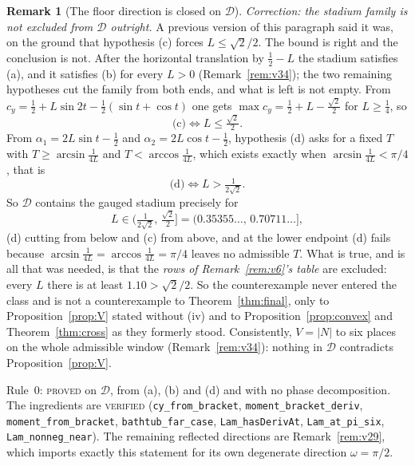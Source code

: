 \documentclass[11pt]{article}
\theoremstyle{definition}
\newtheorem{remark}[theorem]{Remark}
\begin{document}
\begin{remark}[The floor direction is closed on $\mathcal D$]
\emph{Correction: the stadium family is not excluded from $\mathcal D$ outright.} A previous
version of this paragraph said it was, on the ground that hypothesis (c) forces
$L\le\sqrt2/2$. The bound is right and the conclusion is not. After the horizontal
translation by $\tfrac12-L$ the stadium satisfies (a), and it satisfies (b) for every $L>0$
(Remark~\ref{rem:v34}); the two remaining hypotheses cut the family from both ends, and what
is left is not empty. From $c_y=\tfrac12+L\sin2t-\tfrac12(\sin t+\cos t)$ one gets
$\max c_y=\tfrac12+L-\tfrac{\sqrt2}2$ for $L\ge\tfrac14$, so
\[
  \text{(c)}\iff L\le\tfrac{\sqrt2}2 .
\]
From $\alpha_1=2L\sin t-\tfrac12$ and $\alpha_2=2L\cos t-\tfrac12$, hypothesis (d) asks for a
fixed $T$ with $T\ge\arcsin\tfrac1{4L}$ and $T<\arccos\tfrac1{4L}$, which exists exactly when
$\arcsin\tfrac1{4L}<\pi/4$, that is
\[
  \text{(d)}\iff L>\tfrac1{2\sqrt2} .
\]
So $\mathcal D$ contains the gauged stadium precisely for
\[
  L\in\bigl(\tfrac1{2\sqrt2},\,\tfrac{\sqrt2}2\bigr]=(0.35355\ldots,\,0.70711\ldots],
\]
(d) cutting from below and (c) from above, and at the lower endpoint (d) fails because
$\arcsin\tfrac1{4L}=\arccos\tfrac1{4L}=\pi/4$ leaves no admissible $T$. What is true, and is
all that was needed, is that the \emph{rows of Remark~\ref{rem:v6}'s table} are excluded:
every $L$ there is at least $1.10>\sqrt2/2$. So the counterexample never entered the class
and is not a counterexample to Theorem~\ref{thm:final}, only to Proposition~\ref{prop:V}
stated without (iv) and to Proposition~\ref{prop:convex} and Theorem~\ref{thm:cross} as they
formerly stood. Consistently, $V=|N|$ to six places on the whole admissible window
(Remark~\ref{rem:v34}): nothing in $\mathcal D$ contradicts Proposition~\ref{prop:V}.

Rule~0: \textsc{proved} on $\mathcal D$, from (a), (b) and (d) and with no phase
decomposition. The ingredients are \textsc{verified}
(\verb|cy_from_bracket|, \verb|moment_bracket_deriv|, \verb|moment_from_bracket|,
\verb|bathtub_far_case|, \verb|Lam_hasDerivAt|, \verb|Lam_at_pi_six|,
\verb|Lam_nonneg_near|). The remaining
reflected directions are Remark~\ref{rem:v29}, which imports exactly this statement for its
own degenerate direction $\omega=\pi/2$.
\end{remark}
\end{document}
